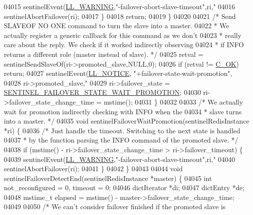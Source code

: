 \begin{DoxyCode}
{{{{{{{{{{{{{{{{{{{{{{{{{{{{{{{{{{{{{{{{{{{{{{{{{{{{{{{{{{{{{{{{{{{{{{{{{{{{{{{{{{{{{{{{{{{{{04015             sentinelEvent(\hyperlink{server_8h_a31229b9334bba7d6be2a72970967a14b}{LL\_WARNING},\textcolor{stringliteral}{"-failover-abort-slave-timeout"},ri,\textcolor{stringliteral}{"%
04016             sentinelAbortFailover(ri);
04017         \}
04018         \textcolor{keywordflow}{return};
04019     \}
04020 
04021     \textcolor{comment}{/* Send SLAVEOF NO ONE command to turn the slave into a master.}
04022 \textcolor{comment}{     * We actually register a generic callback for this command as we don't}
04023 \textcolor{comment}{     * really care about the reply. We check if it worked indirectly observing}
04024 \textcolor{comment}{     * if INFO returns a different role (master instead of slave). */}
04025     retval = sentinelSendSlaveOf(ri->promoted\_slave,NULL,0);
04026     \textcolor{keywordflow}{if} (retval != \hyperlink{server_8h_a303769ef1065076e68731584e758d3e1}{C\_OK}) \textcolor{keywordflow}{return};
04027     sentinelEvent(\hyperlink{server_8h_a8c54c191e436c7dd3012167212692401}{LL\_NOTICE}, \textcolor{stringliteral}{"+failover-state-wait-promotion"},
04028         ri->promoted\_slave,\textcolor{stringliteral}{"%
04029     ri->failover\_state = \hyperlink{sentinel_8c_a49d9c64c03e76dcbf7728ad64dd99330}{SENTINEL\_FAILOVER\_STATE\_WAIT\_PROMOTION};
04030     ri->failover\_state\_change\_time = mstime();
04031 \}
04032 
04033 \textcolor{comment}{/* We actually wait for promotion indirectly checking with INFO when the}
04034 \textcolor{comment}{ * slave turns into a master. */}
04035 \textcolor{keywordtype}{void} sentinelFailoverWaitPromotion(sentinelRedisInstance *ri) \{
04036     \textcolor{comment}{/* Just handle the timeout. Switching to the next state is handled}
04037 \textcolor{comment}{     * by the function parsing the INFO command of the promoted slave. */}
04038     \textcolor{keywordflow}{if} (mstime() - ri->failover\_state\_change\_time > ri->failover\_timeout) \{
04039         sentinelEvent(\hyperlink{server_8h_a31229b9334bba7d6be2a72970967a14b}{LL\_WARNING},\textcolor{stringliteral}{"-failover-abort-slave-timeout"},ri,\textcolor{stringliteral}{"%
04040         sentinelAbortFailover(ri);
04041     \}
04042 \}
04043 
04044 \textcolor{keywordtype}{void} sentinelFailoverDetectEnd(sentinelRedisInstance *master) \{
04045     \textcolor{keywordtype}{int} not\_reconfigured = 0, timeout = 0;
04046     dictIterator *di;
04047     dictEntry *de;
04048     mstime\_t elapsed = mstime() - master->failover\_state\_change\_time;
04049 
04050     \textcolor{comment}{/* We can't consider failover finished if the promoted slave is}
}}}}}}}}}}}}}}}}}}}}}}}}}}}}}}}}}}}}}}}}}}}}}}}}}}}}}}}}}}}}}}}}}}}}}}}}}}}}}}}}}}}}}}}}}}}}}}}}
\end{DoxyCode}
